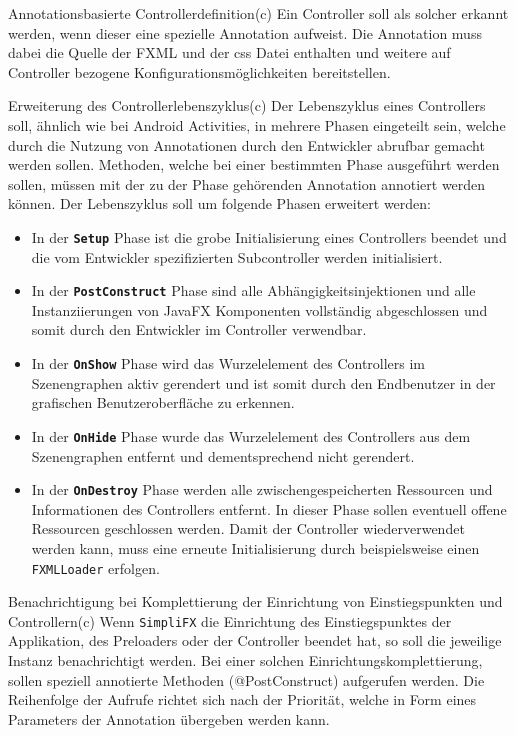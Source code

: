 \begin{freq}{Annotationsbasierte Controllerdefinition}(c)
	Ein Controller soll als solcher erkannt werden, wenn dieser eine spezielle Annotation aufweist. Die Annotation muss dabei die Quelle der FXML und der \ac{css} Datei enthalten und weitere auf Controller bezogene Konfigurationsmöglichkeiten bereitstellen.
\end{freq}
\begin{freq}{Erweiterung des Controllerlebenszyklus}(c)
	Der Lebenszyklus eines Controllers soll, ähnlich wie bei Android Activities, in mehrere Phasen eingeteilt sein, welche durch die Nutzung von Annotationen durch den Entwickler abrufbar gemacht werden sollen. Methoden, welche bei einer bestimmten Phase ausgeführt werden sollen, müssen mit der zu der Phase gehörenden Annotation annotiert werden können. Der Lebenszyklus soll um folgende Phasen erweitert werden:
	\begin{itemize}
		\item In der \textbf{\texttt{Setup}} Phase ist die grobe Initialisierung eines Controllers beendet und die vom Entwickler spezifizierten Subcontroller werden initialisiert.
		\item In der \textbf{\texttt{PostConstruct}} Phase sind alle Abhängigkeitsinjektionen und alle Instanziierungen von JavaFX Komponenten vollständig abgeschlossen und somit durch den Entwickler im Controller verwendbar.
		\item In der \textbf{\texttt{OnShow}} Phase wird das Wurzelelement des Controllers im Szenengraphen aktiv gerendert und ist somit durch den Endbenutzer in der grafischen Benutzeroberfläche zu erkennen.
		\item In der \textbf{\texttt{OnHide}} Phase wurde das Wurzelelement des Controllers aus dem Szenengraphen entfernt und dementsprechend nicht gerendert.
		\item In der \textbf{\texttt{OnDestroy}} Phase werden alle zwischengespeicherten Ressourcen und Informationen des Controllers entfernt. In dieser Phase sollen eventuell offene Ressourcen geschlossen werden. Damit der Controller wiederverwendet werden kann, muss eine erneute Initialisierung durch beispielsweise einen \texttt{FXMLLoader} erfolgen.
	\end{itemize}
\end{freq}
\begin{freq}{Benachrichtigung bei Komplettierung der Einrichtung von Einstiegspunkten und Controllern}(c)
	Wenn \texttt{SimpliFX} die Einrichtung des Einstiegspunktes der Applikation, des Preloaders oder der Controller beendet hat, so soll die jeweilige Instanz benachrichtigt werden. Bei einer solchen Einrichtungskomplettierung, sollen speziell annotierte Methoden (@PostConstruct) aufgerufen werden. Die Reihenfolge der Aufrufe richtet sich nach der Priorität, welche in Form eines Parameters der Annotation übergeben werden kann.
\end{freq}
